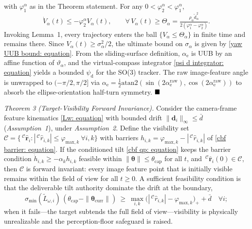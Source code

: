 \documentclass{IEEEtaes}
\begin{document}
with $\varphi_1^\alpha$ as in the Theorem statement. For any $0<\varphi_2^\alpha<\varphi_1^\alpha$,
\begin{equation*}
\dot{V}_\alpha(t)\le -\varphi_2^\alpha V_\alpha(t),\qquad \forall\,V_\alpha(t)\ge\Theta_\alpha = \tfrac{\rho_\alpha\tilde{d}_\alpha^2}{2(\varphi_1^\alpha-\varphi_2^\alpha)}.
\end{equation*}
Invoking Lemma~1, every trajectory enters the ball $\{V_\alpha\le\Theta_\alpha\}$ in finite time and remains there. Since $V_\alpha(t)\ge\sigma_\alpha^2/2$, the ultimate bound on $\sigma_\alpha$ is given by \eqref{yaw UUB bound: equation}. From the sliding-surface definition, $\alpha_\text{e}$ is UUB by an affine function of $\vartheta_\alpha$, and the virtual-compass integrator \eqref{psi d integrator: equation} yields a bounded $\psi_\text{d}$ for the SO(3) tracker. The raw image-feature angle is unwrapped to $(-\pi/2,\pi/2]$ via $\alpha_\text{e} = \tfrac12\text{atan2}(\sin(2\alpha_\text{e}^\text{raw}),\cos(2\alpha_\text{e}^\text{raw}))$ to absorb the ellipse-orientation half-turn symmetry. $\hfill\blacksquare$

\textit{Theorem 3 (Target-Visibility Forward Invariance).}
Consider the camera-frame feature kinematics \eqref{Lw: equation} with bounded drift $\|\boldsymbol{d}_i\|_\infty\le\bar{d}$ (\textit{Assumption~1}), under \textit{Assumption~2}. Define the visibility set $\mathcal{C}=\{\,^\mathcal{C}\hat{\boldsymbol{r}}_i:|\,^\mathcal{C}\hat{r}_{i,k}|\le\varphi_{\text{max},k}\ \forall i,k\}$ with barriers $h_{i,k}=\varphi_{\text{max},k}-|\,^\mathcal{C}\hat{r}_{i,k}|$ of \eqref{cbf barrier: equation}. If the conditioned tilt \eqref{cbf qp: equation} keeps the barrier condition $\dot{h}_{i,k}\ge-\alpha_k h_{i,k}$ feasible within $\|\boldsymbol{\theta}\|\le\theta_\text{cap}$ for all $t$, and $\,^\mathcal{C}\hat{\boldsymbol{r}}_i(0)\in\mathcal{C}$, then $\mathcal{C}$ is forward invariant: every image feature point that is initially visible remains within the field of view for all $t\ge 0$. A sufficient feasibility condition is that the deliverable tilt authority dominate the drift at the boundary,
\begin{equation} \label{cbf feasibility: equation}
    \sigma_{\min}(\tilde{L}_{\omega,i})\,(\theta_\text{cap}-\|\boldsymbol{\theta}_\text{curr}\|)\ \ge\ \max_{i,k}\big(|\,^\mathcal{C}\hat{r}_{i,k}|-\varphi_{\text{max},k}\big)_+ + \bar{d}\quad\forall i;
\end{equation}
when it fails---the target subtends the full field of view---visibility is physically unrealizable and the perception-floor safeguard is raised.
\end{document}

